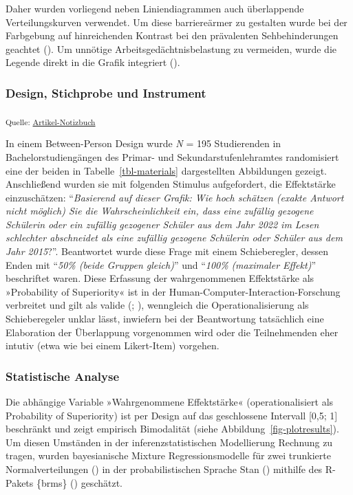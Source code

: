 \documentclass[
  jou,
  floatsintext,
  longtable,
  nolmodern,
  notxfonts,
  notimes,
  colorlinks=true,linkcolor=blue,citecolor=blue,urlcolor=blue]{apa7}
\begin{document}
Daher wurden vorliegend neben Liniendiagrammen auch überlappende
Verteilungskurven verwendet. Um diese barriereärmer zu gestalten wurde
bei der Farbgebung auf hinreichenden Kontrast bei den prävalenten
Sehbehinderungen geachtet (). Um unnötige Arbeitsgedächtnisbelastung zu vermeiden, wurde die
Legende direkt in die Grafik integriert
().

\subsubsection{Design, Stichprobe und
Instrument}\label{design-stichprobe-und-instrument}

\textsubscript{Quelle:
\href{https://sammerk.github.io/StudienergebnisseBesserKommunizieren/index.qmd.html}{Artikel-Notizbuch}}

In einem Between-Person Design wurde \emph{N} = 195 Studierenden in
Bachelorstudiengängen des Primar- und Sekundarstufenlehramtes
randomisiert eine der beiden in Tabelle~\ref{tbl-materials}
dargestellten Abbildungen gezeigt. Anschließend wurden sie mit folgenden
Stimulus aufgefordert, die Effektstärke einzuschätzen: ``\emph{Basierend
auf dieser Grafik: Wie hoch schätzen (exakte Antwort nicht möglich) Sie
die Wahrscheinlichkeit ein, dass eine zufällig gezogene Schülerin oder
ein zufällig gezogener Schüler aus dem Jahr 2022 im Lesen schlechter
abschneidet als eine zufällig gezogene Schülerin oder Schüler aus dem
Jahr 2015}?''. Beantwortet wurde diese Frage mit einem Schieberegler,
dessen Enden mit ``\emph{50\% (beide Gruppen gleich)}'' und
``\emph{100\%} \emph{(maximaler Effekt)}'' beschriftet waren. Diese
Erfassung der wahrgenommenen Effektstärke als »Probability of
Superiority« ist in der Human-Computer-Interaction-Forschung verbreitet
und gilt als valide (;
), wenngleich die
Operationalisierung als Schieberegeler unklar lässt, inwiefern bei der
Beantwortung tatsächlich eine Elaboration der Überlappung vorgenommen
wird oder die Teilnehmenden eher intutiv (etwa wie bei einem
Likert-Item) vorgehen.

\subsubsection{Statistische Analyse}\label{statistische-analyse}

Die abhängige Variable »Wahrgenommene Effektstärke« (operationalisiert
als Probability of Superiority) ist per Design auf das geschlossene
Intervall {[}0,5; 1{]} beschränkt und zeigt empirisch Bimodalität (siehe
Abbildung~\ref{fig-plotresults}). Um diesen Umständen in der
inferenzstatistischen Modellierung Rechnung zu tragen, wurden
bayesianische Mixture Regressionsmodelle für zwei trunkierte
Normalverteilungen () in der probabilistischen Sprache Stan
()
mithilfe des R-Pakets \{brms\} () geschätzt.
\end{document}
